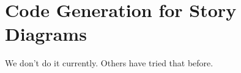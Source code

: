%
%
%
%


\section{Code Generation for Story Diagrams}
 We don't do it currently. Others have tried that before.\cite{GBD07}